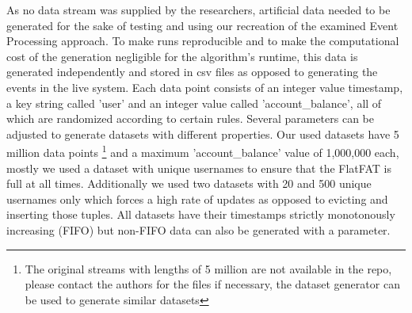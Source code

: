 As no data stream was supplied by the researchers, artificial data needed to be generated
for the sake of testing and using our recreation of the examined Event Processing approach.
To make runs reproducible and to make the computational cost of the generation negligible
for the algorithm's runtime, this data is generated independently and stored in csv files
as opposed to generating the events in the live system.
Each data point consists of an integer value timestamp, a key string called 'user' and
an integer value called 'account\_balance', all of which are randomized according to certain rules.
Several parameters can be adjusted to generate datasets with different properties.
Our used datasets have 5 million data points
\footnote{\noindent The original streams with lengths of 5 million are not available
in the repo, please contact the authors for the files if necessary, the dataset
generator can be used to generate similar datasets}
and a maximum 'account\_balance' value of 1,000,000 each,
mostly we used a dataset with unique usernames to ensure that the FlatFAT is full at all times.
Additionally we used two datasets with 20 and 500 unique usernames only
which forces a high rate of updates as opposed to evicting and inserting those tuples.
All datasets have their timestamps strictly monotonously increasing (FIFO)
but non-FIFO data can also be generated with a parameter.
